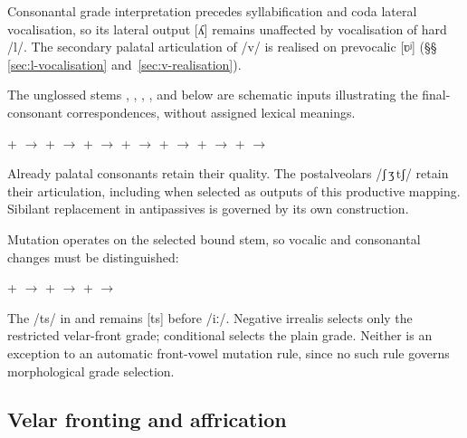 Consonantal grade interpretation precedes syllabification and coda lateral vocalisation,
so its lateral output [ʎ] remains unaffected by vocalisation of hard /l/.
The secondary palatal articulation of /v/ is realised on prevocalic [ʋʲ]
(§§\,\ref{sec:l-vocalisation} and~\ref{sec:v-realisation}).

The unglossed stems , , , , and
 below are schematic inputs illustrating the final-consonant
correspondences, without assigned lexical meanings.

\pex
\a {} +  $\rightarrow$ 
\a {} +  $\rightarrow$ 
\a {} +  $\rightarrow$ 
\a {} +  $\rightarrow$ 
\a {} +  $\rightarrow$ 
\a {} +  $\rightarrow$ 
\a {} +  $\rightarrow$ 
\xe

Already palatal consonants retain their quality. The postalveolars
/ʃ\,ʒ\,tʃ/ retain their articulation, including when selected as outputs
of this productive mapping.
Sibilant replacement in antipassives is governed by its own construction.

Mutation operates on the selected bound stem, so vocalic and consonantal
changes must be distinguished:

\pex
\a {} +  $\rightarrow$ 
\a {} +  $\rightarrow$ 
\a {} +  $\rightarrow$ 
\xe

The /ts/ in  and  remains [ts] before /iː/.
Negative irrealis  selects
only the restricted velar-front grade; conditional  selects the
plain grade. Neither is an exception to an automatic front-vowel mutation
rule, since no such rule governs morphological grade selection.

\subsection{Velar fronting and affrication}\label{sec:velar-fronting}

